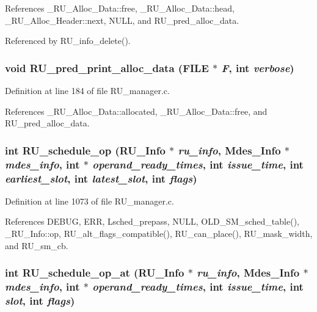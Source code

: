 References \_\-RU\_\-Alloc\_\-Data::free, \_\-RU\_\-Alloc\_\-Data::head, \_\-RU\_\-Alloc\_\-Header::next, NULL, and RU\_\-pred\_\-alloc\_\-data.

Referenced by RU\_\-info\_\-delete().
\subsubsection{\setlength{\rightskip}{0pt plus 5cm}void RU\_\-pred\_\-print\_\-alloc\_\-data (FILE $\ast$ {\em F}, int {\em verbose})}\label{RU__manager_8c_4cac910dd43ec706aad66ab1ca80377e}




Definition at line 184 of file RU\_\-manager.c.

References \_\-RU\_\-Alloc\_\-Data::allocated, \_\-RU\_\-Alloc\_\-Data::free, and RU\_\-pred\_\-alloc\_\-data.
\subsubsection{\setlength{\rightskip}{0pt plus 5cm}int RU\_\-schedule\_\-op (\bf{RU\_\-Info} $\ast$ {\em ru\_\-info}, Mdes\_\-Info $\ast$ {\em mdes\_\-info}, int $\ast$ {\em operand\_\-ready\_\-times}, int {\em issue\_\-time}, int {\em earliest\_\-slot}, int {\em latest\_\-slot}, int {\em flags})}\label{RU__manager_8c_fa44bbc4a93b2ec9886306943a1ceba6}




Definition at line 1073 of file RU\_\-manager.c.

References DEBUG, ERR, Lsched\_\-prepass, NULL, OLD\_\-SM\_\-sched\_\-table(), \_\-RU\_\-Info::op, RU\_\-alt\_\-flags\_\-compatible(), RU\_\-can\_\-place(), RU\_\-mask\_\-width, and RU\_\-sm\_\-cb.
\subsubsection{\setlength{\rightskip}{0pt plus 5cm}int RU\_\-schedule\_\-op\_\-at (\bf{RU\_\-Info} $\ast$ {\em ru\_\-info}, Mdes\_\-Info $\ast$ {\em mdes\_\-info}, int $\ast$ {\em operand\_\-ready\_\-times}, int {\em issue\_\-time}, int {\em slot}, int {\em flags})}\label{RU__manager_8c_450f3855ffb14ac781f78eda9ca33ed0}




